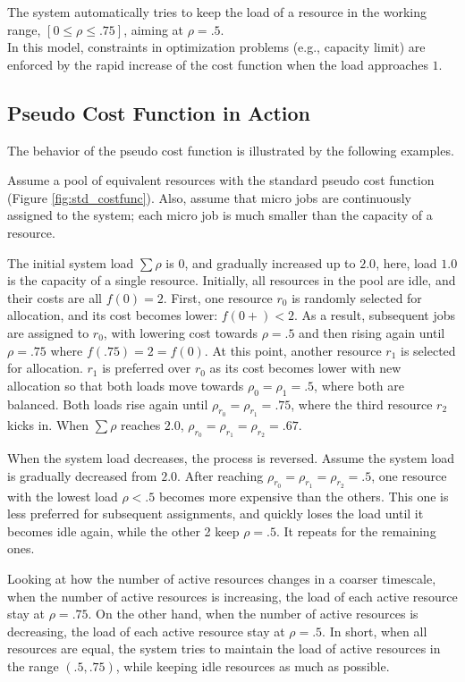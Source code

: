 The system automatically tries to keep the load of a resource in the
working range, $[0 \le \rho \le .75]$, aiming at $\rho = .5$. \\

In this model, constraints in optimization problems (e.g.,
capacity limit) are enforced by the rapid increase of the cost function when
the load approaches $1$.

\subsection{Pseudo Cost Function in Action}

The behavior of the pseudo cost function is illustrated by the
following examples.

Assume a pool of equivalent resources with the standard pseudo cost
function (Figure \ref{fig:std_costfunc}).
Also, assume that micro jobs are continuously assigned to the
system; each micro job is much smaller than the capacity of a
resource.

The initial system load $\sum \rho$ is $0$, and gradually increased
up to $2.0$, here, load $1.0$ is the capacity of a single resource.
Initially, all resources in the pool are idle, and their costs are
all $f(0)= 2$.
First, one resource $r_{0}$ is randomly selected for allocation, and its
cost becomes lower: $f(0+) < 2$. As a result, subsequent jobs are
assigned to $r_{0}$, with lowering cost towards $\rho = .5$ and then
rising again until $\rho = .75$ where $f(.75) = 2 = f(0)$.
At this point, another resource $r_{1}$ is selected for allocation.
$r_{1}$ is preferred over $r_{0}$ as its cost becomes lower with new
allocation so that both loads move towards $\rho_{0} = \rho_{1} = .5$,
where both are balanced.
Both loads rise again until $\rho_{r_{0}} = \rho_{r_{1}} = .75$,
where the third resource $r_{2}$ kicks in.
When $\sum \rho$ reaches $2.0$, $\rho_{r_{0}} = \rho_{r_{1}} = \rho_{r_{2}} = .67$.

When the system load decreases, the process is reversed.
Assume the system load is gradually decreased from $2.0$.
After reaching $\rho_{r_{0}} = \rho_{r_{1}} = \rho_{r_{2}} = .5$,
one resource with the lowest load $\rho < .5$ becomes more expensive
than the others.
This one is less preferred for subsequent assignments, and quickly
loses the load until it becomes idle again, while the other 2 keep
$\rho = .5$. It repeats for the remaining ones.

Looking at how the number of active resources changes in a coarser
timescale,
when the number of active resources is increasing, the load of each
active resource stay at $\rho = .75$.
On the other hand, when the number of active resources is decreasing,
the load of each active resource stay at $\rho = .5$.
In short, when all resources are equal, the system tries to maintain
the load of active resources in the range $(.5, .75)$, while keeping
idle resources as much as possible.


